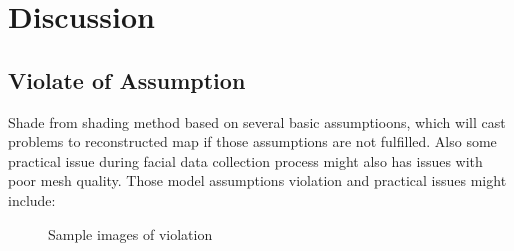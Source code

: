 \documentclass[a4paper]{article}
\begin{document}
\section{Discussion}
\subsection{Violate of Assumption}
Shade from shading method based on several basic assumptioons, which will cast problems to reconstructed map if those assumptions are not fulfilled. Also some practical issue during facial data collection process might also has issues with poor mesh quality. Those model assumptions violation and practical issues might include:

\begin{figure}[h!]
\centering
{}
\caption{Sample images of violation\label{fig:vio}}
\end{figure}
\end{document}
